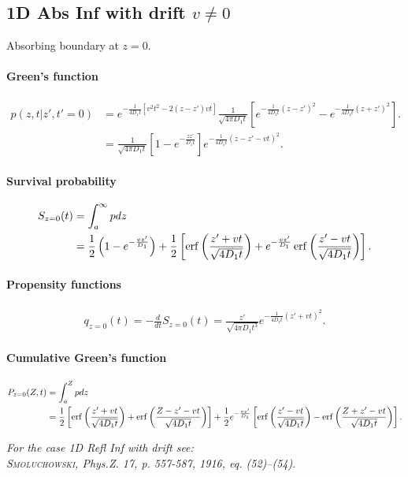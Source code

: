 
\subsection{1D Abs Inf with drift $v\neq 0$}

Absorbing boundary at $z=0$.

\paragraph{Green's function}
\begin{align}
 p(z,t|z',t'=0)	&= e^{-\frac{1}{4D_1t}\left[v^2t^2 - 2(z-z')vt \right]} \frac{1}{\sqrt{4\pi D_1t}}
			\left[ e^{-\frac{1}{4D_1t}(z-z')^2} - e^{-\frac{1}{4D_1t}(z+z')^2} \right].	\\
		&= \frac{1}{\sqrt{4\pi D_1t}} \left[ 1 - e^{-\frac{zz'}{D_1t}} \right]e^{-\frac{1}{4D_1t}(z-z'-vt)^2}.
\end{align}

\paragraph{Survival probability}
\begin{align}
  S_{z=0}(t) &= \int_a^\infty p dz				\\
& = \frac{1}{2}\left( 1 - e^{-\frac{vz'}{D_1}} \right)
  + \frac{1}{2} \left[ \operatorname{erf}{\left(\frac{z'+vt}{\sqrt{4D_1t}}\right)} + e^{-\frac{vz'}{D_1}} \operatorname{erf}{\left(\frac{z'-vt}{\sqrt{4D_1t}}\right)} \right] .
\end{align}

\paragraph{Propensity functions}
\begin{align}
  q_{z=0}(t) = -\frac{d}{dt} S_{z=0}(t)=
  \frac{z'}{\sqrt{4 \pi D_1 t^3}} e^{-\frac{1}{4D_1t}(z'+vt)^2} .
\end{align}

\paragraph{Cumulative Green's function}
\begin{align}
  P_{z=0}(Z,t) &= \int_a^Z p dz 													\\
& = \frac{1}{2} \left[ \operatorname{erf}{\left(\frac{z'+vt}{\sqrt{4D_1t}}\right)} + \operatorname{erf}{\left(\frac{Z-z'-vt}{\sqrt{4D_1t}}\right)} \right]
  +\frac{1}{2} e^{-\frac{vz'}{D_1}} \left[ \operatorname{erf}{\left(\frac{z'-vt}{\sqrt{4D_1t}}\right)} - \operatorname{erf}{\left(\frac{Z+z'-vt}{\sqrt{4D_1t}}\right)} \right] .
\end{align}

\vspace{1cm}
\noindent \textit{For the case 1D Refl Inf with drift see:}\\
\textit{\textsc{Smoluchowski}, Phys.Z. 17, p. 557-587, 1916, eq. (52)--(54)}.